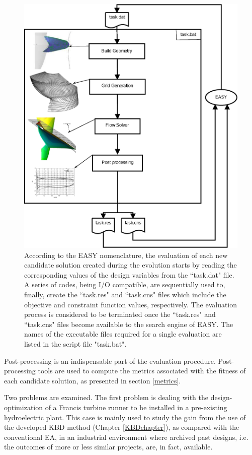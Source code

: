 \begin{figure}[h!]
\centering
\includegraphics[width=135mm]{Optimizationloop.eps} 
\caption{According to the EASY nomenclature, the evaluation of each new candidate solution created during the evolution starts by reading the corresponding values of the design variables from the ``task.dat" file. A series of codes, being I/O compatible, are sequentially used to, finally, create the ``task.res" and ``task.cns" files which include the objective and constraint function values, respectively. The evaluation process is considered to be terminated once the ``task.res" and ``task.cns" files  become available to the search engine of EASY. The names of the executable files required for a single evaluation are listed in the script file "task.bat". }
\label{evaltool}
\end{figure}      


Post-processing is an indispensable part of the evaluation procedure. Post-processing tools are used to compute the metrics associated with the fitness of each candidate solution, as presented in section \ref{metrics}. 

Two problems are examined. The first problem is  dealing with the design-optimization of a Francis turbine runner to be installed in a pre-existing hydroelectric plant. This case is mainly used to study the gain from the use of the developed KBD method (Chapter \ref{KBDchapter}), as compared with the conventional EA, in an industrial environment where archived past designs, i.e. the outcomes of more or less similar projects, are, in fact, available.

